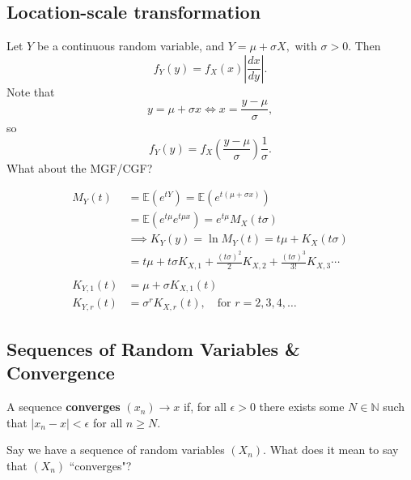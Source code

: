 
\subsection{Location-scale transformation}
Let $Y$ be a continuous random variable, and $Y=\mu+\sigma X,$ with $\sigma>0$. Then
$$f_Y(y)=f_X(x)\left|\frac{dx}{dy}\right|.$$
Note that
$$y=\mu+\sigma x\iff x=\frac{y-\mu}{\sigma},$$
so
$$
f_Y(y)=f_X\left(\frac{y-\mu}{\sigma}\right)\frac{1}{\sigma}.
$$
What about the MGF/CGF?

\begin{align*}
    M_Y(t)&=\mathbb E(e^{tY})=\mathbb E(e^{t(\mu+\sigma x)}) \\
    &=\mathbb E(e^{t\mu}e^{t\mu x})=e^{t\mu}M_X(t\sigma) \\
    &\implies K_Y(y)=\ln M_Y(t)=t\mu+K_X(t\sigma) \\
    &=t\mu+t\sigma K_{X,1}+\frac{(t\sigma)^2}{2}K_{X,2}+\frac{(t\sigma)^3}{3!}K_{X,3}\cdots \\
	\\
    K_{Y,1}(t)&= \mu+\sigma K_{X,1}(t)\\
    K_{Y,r}(t)&=\sigma^rK_{X,r}(t) , \quad  \text{for } r=2,3,4,\ldots
\end{align*}

\subsection{\texorpdfstring{Sequences of Random Variables \& Convergence}{Sequences of Random Variables and Convergence}}

\begin{definition}
A sequence \textbf{converges} $(x_n)\to x$ if, for all $\epsilon>0$ there exists some $N\in \mathbb N$ such that  $|x_n-x|<\epsilon$ for all $n\geq N$.

\end{definition}

Say we have a sequence of random variables $(X_n).$ What does it mean to say that $(X_n)$ ``converges"?

